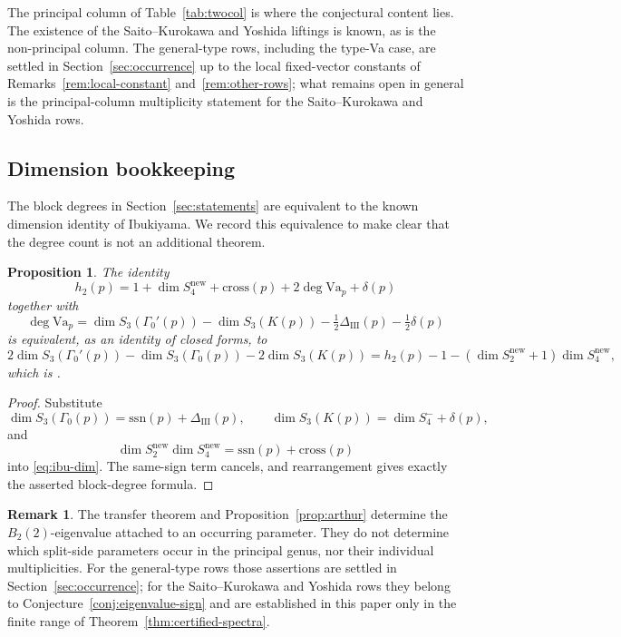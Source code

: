 \documentclass[11pt]{amsart}
\theoremstyle{plain}
\newtheorem{proposition}[theorem]{Proposition}
\theoremstyle{definition}
\newtheorem{remark}[theorem]{Remark}
\newcommand{\Va}{\mathrm{Va}}
\newcommand{\snew}{S^{\mathrm{new}}}
\providecommand{\Va}{\mathrm{Va}}
\providecommand{\snew}{S^{\mathrm{new}}}
\begin{document}
	The principal column of Table~\ref{tab:twocol} is where the conjectural
	content lies. The existence of the Saito--Kurokawa and Yoshida liftings is
	known, as is the non-principal column. The general-type rows, including the
	type-Va case, are settled in Section~\ref{sec:occurrence} up to the local
	fixed-vector constants of Remarks~\ref{rem:local-constant}
	and~\ref{rem:other-rows}; what remains open in general is the
	principal-column multiplicity statement for the Saito--Kurokawa and Yoshida
	rows.
	
	\subsection{Dimension bookkeeping}
	\label{ss:dimension-bookkeeping}
	
	The block degrees in Section~\ref{sec:statements} are equivalent to the
	known dimension identity of Ibukiyama. We record this equivalence to make
	clear that the degree count is not an additional theorem.
	
	\begin{proposition}
		\label{prop:VI}
		The identity
		\[
		h_2(p)=1+\dim\snew_4+\mathrm{cross}(p)
		+2\deg\Va_p+\delta(p)
		\]
		together with
		\[
		\deg\Va_p
		=\dim S_3(\Gamma_0'(p))-
		\dim S_3(K(p))-\tfrac12\Delta_{\mathrm{III}}(p)-\tfrac12\delta(p)
		\]
		is equivalent, as an identity of closed forms, to
		\begin{equation}\label{eq:ibu-dim}
			2\dim S_3(\Gamma_0'(p))-
			\dim S_3(\Gamma_0(p))-2\dim S_3(K(p))
			=h_2(p)-1-(\dim\snew_2+1)\dim\snew_4,
		\end{equation}
		which is \cite[Thm.~3.1, $j=0$]{Ibukiyama2018conj}.
	\end{proposition}
	
	\begin{proof}
		Substitute
		\[
		\dim S_3(\Gamma_0(p))=\mathrm{ssn}(p)+\Delta_{\mathrm{III}}(p),
		\qquad
		\dim S_3(K(p))=\dim S_4^-+\delta(p),
		\]
		and
		\[
		\dim\snew_2\dim\snew_4
		=\mathrm{ssn}(p)+\mathrm{cross}(p)
		\]
		into \eqref{eq:ibu-dim}. The same-sign term cancels, and rearrangement
		gives exactly the asserted block-degree formula.
	\end{proof}
	
	\begin{remark}
		\label{rem:transfer-scope}
		The transfer theorem and Proposition~\ref{prop:arthur} determine the
		$B_2(2)$-eigenvalue attached to an occurring parameter. They do not
		determine which split-side parameters occur in the principal genus, nor
		their individual multiplicities. For the general-type rows those assertions are settled in
		Section~\ref{sec:occurrence}; for the Saito--Kurokawa and Yoshida rows
		they belong to Conjecture~\ref{conj:eigenvalue-sign} and are
		established in this paper only in the finite range of
		Theorem~\ref{thm:certified-spectra}.
	\end{remark}
	
\end{document}
